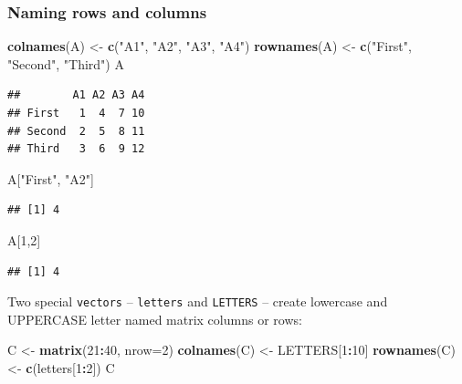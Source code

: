 \documentclass[]{book}
\newenvironment{Shaded}{\begin{snugshade}}{\end{snugshade}}
\newcommand{\DataTypeTok}[1]{\textcolor[rgb]{0.13,0.29,0.53}{#1}}
\newcommand{\DecValTok}[1]{\textcolor[rgb]{0.00,0.00,0.81}{#1}}
\newcommand{\KeywordTok}[1]{\textcolor[rgb]{0.13,0.29,0.53}{\textbf{#1}}}
\newcommand{\NormalTok}[1]{#1}
\newcommand{\OperatorTok}[1]{\textcolor[rgb]{0.81,0.36,0.00}{\textbf{#1}}}
\newcommand{\StringTok}[1]{\textcolor[rgb]{0.31,0.60,0.02}{#1}}
\theoremstyle{definition}
\theoremstyle{definition}
\theoremstyle{definition}
\theoremstyle{remark}
\begin{document}
\hypertarget{naming-rows-and-columns}{%
\subsubsection{Naming rows and columns}\label{naming-rows-and-columns}}

\begin{Shaded}
\begin{Highlighting}[]
\KeywordTok{colnames}\NormalTok{(A) <-}\StringTok{ }\KeywordTok{c}\NormalTok{(}\StringTok{"A1"}\NormalTok{, }\StringTok{"A2"}\NormalTok{, }\StringTok{"A3"}\NormalTok{, }\StringTok{"A4"}\NormalTok{)}
\KeywordTok{rownames}\NormalTok{(A) <-}\StringTok{ }\KeywordTok{c}\NormalTok{(}\StringTok{"First"}\NormalTok{, }\StringTok{"Second"}\NormalTok{, }\StringTok{"Third"}\NormalTok{)}
\NormalTok{A}
\end{Highlighting}
\end{Shaded}

\begin{verbatim}
##        A1 A2 A3 A4
## First   1  4  7 10
## Second  2  5  8 11
## Third   3  6  9 12
\end{verbatim}

\begin{Shaded}
\begin{Highlighting}[]
\NormalTok{A[}\StringTok{"First"}\NormalTok{, }\StringTok{"A2"}\NormalTok{]}
\end{Highlighting}
\end{Shaded}

\begin{verbatim}
## [1] 4
\end{verbatim}

\begin{Shaded}
\begin{Highlighting}[]
\NormalTok{A[}\DecValTok{1}\NormalTok{,}\DecValTok{2}\NormalTok{]}
\end{Highlighting}
\end{Shaded}

\begin{verbatim}
## [1] 4
\end{verbatim}

Two special \texttt{vectors} -- \texttt{letters} and \texttt{LETTERS} --
create lowercase and UPPERCASE letter named matrix columns or rows:

\begin{Shaded}
\begin{Highlighting}[]
\NormalTok{C <-}\StringTok{ }\KeywordTok{matrix}\NormalTok{(}\DecValTok{21}\OperatorTok{:}\DecValTok{40}\NormalTok{, }\DataTypeTok{nrow=}\DecValTok{2}\NormalTok{)}
\KeywordTok{colnames}\NormalTok{(C) <-}\StringTok{ }\NormalTok{LETTERS[}\DecValTok{1}\OperatorTok{:}\DecValTok{10}\NormalTok{]}
\KeywordTok{rownames}\NormalTok{(C) <-}\StringTok{ }\KeywordTok{c}\NormalTok{(letters[}\DecValTok{1}\OperatorTok{:}\DecValTok{2}\NormalTok{])}
\NormalTok{C}
\end{Highlighting}
\end{Shaded}
\end{document}
